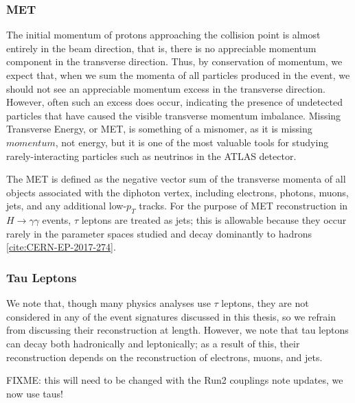 \subsubsection{MET} \label{sec:MET}

The initial momentum of protons approaching the collision point is almost entirely in the beam direction, that is, there is no appreciable momentum component in the transverse direction. Thus, by conservation of momentum, we expect that, when we sum the momenta of all particles produced in the event, we should not see an appreciable momentum excess in the transverse direction. However, often such an excess does occur, indicating the presence of undetected particles that have caused the visible transverse momentum imbalance. Missing Transverse Energy, or MET, is something of a misnomer, as it is missing $momentum$, not energy, but it is one of the most valuable tools for studying rarely-interacting particles such as neutrinos in the ATLAS detector.

The MET is defined as the negative vector sum of the transverse  momenta of all objects associated with the diphoton vertex, including electrons, photons, muons, jets, and any additional low-$p_{T}$ tracks. For the purpose of MET reconstruction in $H \rightarrow \gamma \gamma$ events, $\tau$ leptons are treated as jets; this is allowable because they occur rarely in the parameter spaces studied and decay dominantly to hadrons \ref{cite:CERN-EP-2017-274}.

\subsubsection{Tau Leptons} \label{sec:taus}
We note that, though many physics analyses use $\tau$ leptons, they are not considered in any of the event signatures discussed in this thesis, so we refrain from discussing their reconstruction at length. However, we note that tau leptons can decay both hadronically and leptonically; as a result of this, their reconstruction depends on the reconstruction of electrons, muons, and jets.

FIXME: this will need to be changed with the Run2 couplings note updates, we now use taus!